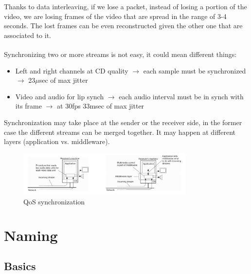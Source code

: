 \documentclass[10pt,a4paper]{article}
\begin{document}
Thanks to data interleaving, if we lose a packet, instead of losing a portion of the video, we are losing frames of the video that are spread in the range of 3-4 seconds. The lost frames can be even reconstructed given the other one that are associated to it. \\ \\
Synchronizing two or more streams is not easy, it could mean different things:
\begin{itemize}
	\item Left and right channels at CD quality $\rightarrow$ each sample must be synchronized $\rightarrow$ 23$\mu$sec of max jitter
	\item Video and audio for lip synch $\rightarrow$ each audio interval must be in synch with its frame $\rightarrow$ at 30fps 33msec of max jitter
\end{itemize}
Synchronization may take place at the sender or the receiver side, in the former case the different streams can be merged together. It may happen at different layers (application vs. middleware).
 \begin{figure}[h!]
 \hfill \includegraphics[width=250pt]{images/qos-sync.png}\hspace*{\fill}
 \caption{QoS synchronization}
  \label{fig:qos-sync}
\end{figure}
\section{\LARGE Naming}
\subsection{Basics}
\end{document}
